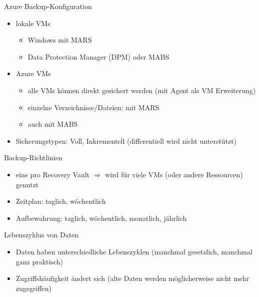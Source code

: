 \begin{flashcard}[Definition]{Azure Backup-Konfiguration}
  \begin{itemize}
    \item lokale VMs
      \begin{itemize}
        \item Windows mit MARS
        \item Data Protection Manager (DPM) oder MABS
      \end{itemize}
    \item Azure VMs
      \begin{itemize}
        \item alle VMs können direkt gesichert werden (mit Agent als VM Erweiterung)
        \item einzelne Verzeichnisse/Dateien: mit MARS
        \item auch mit MABS
      \end{itemize}
    \item Sicherungstypen: Voll, Inkrementell (differentiell wird nicht unterstützt)
  \end{itemize}
\end{flashcard}

\begin{flashcard}[Definition]{Backup-Richtlinien}
  \begin{itemize}
    \item eine pro Recovery Vault\newline
      $\Rightarrow$ wird für viele VMs (oder andere Ressourcen) genutzt
    \item Zeitplan: taglich, wöchentlich
    \item Aufbewahrung: taglich, wöchentlich, monatlich, jährlich
  \end{itemize}
\end{flashcard}


\begin{flashcard}[Definition]{Lebenszyklus von Daten}
  \begin{itemize}
    \item Daten haben unterschiedliche Lebenszyklen (manchmal gesetzlich, manchmal ganz praktisch)
    \item Zugriffshäufigkeit ändert sich (alte Daten werden möglicherweise nicht mehr zugegriffen)
  \end{itemize}
\end{flashcard}

